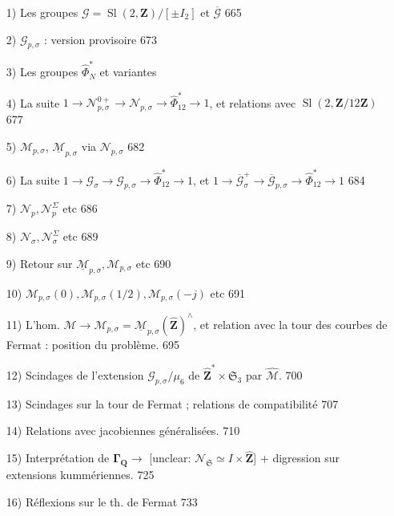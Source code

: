 \begin{enumerate}
\item[1)] Les groupes $\mathcal{G} = \operatorname{Sl}(2, \mathbf{Z}) / [\pm I_2]$ et $\overline{\mathcal{G}}$ \hfill 665
\item[2)] $\mathcal{G}_{p,\sigma}$ : version provisoire \hfill 673
\item[3)] Les groupes $\widehat{\Phi}_N^*$ et variantes
\item[4)] La suite $1 \to \mathcal{N}_{p,\sigma}^{0+} \to \mathcal{N}_{p,\sigma} \to \widehat{\Phi}_{12}^* \to 1$, et relations avec $\operatorname{Sl}(2, \mathbf{Z}/12\mathbf{Z})$ \hfill 677
\item[5)] $\mathcal{M}_{p,\sigma}$, $\underline{\mathcal{M}}_{p,\sigma}$ via $\mathcal{N}_{p,\sigma}$ \hfill 682
\item[6)] La suite $1 \to \mathcal{G}_\sigma \to \mathcal{G}_{p,\sigma} \to \widehat{\Phi}_{12}^* \to 1$, et $1 \to \overline{\mathcal{G}}_\sigma^+ \to \overline{\mathcal{G}}_{p,\sigma} \to \widehat{\Phi}_{12}^* \to 1$ \hfill 684
\item[7)] $\mathcal{N}_p, \mathcal{N}_p^\Sigma$ etc \hfill 686
\item[8)] $\mathcal{N}_\sigma, \mathcal{N}_\sigma^\Sigma$ etc \hfill 689
\item[9)] Retour sur $\underline{\mathcal{M}}_{p,\sigma}, \mathcal{M}_{p,\sigma}$ etc \hfill 690
\item[10)] $\mathcal{M}_{p,\sigma}(0), \mathcal{M}_{p,\sigma}(1/2), \mathcal{M}_{p,\sigma}(-j)$ etc \hfill 691
\item[11)] L'hom. $\mathcal{M} \to \mathcal{M}_{p,\sigma} = \underline{\mathcal{M}}_{p,\sigma}(\hat{\mathbf{Z}})^{\wedge}$, et relation avec la tour des courbes de Fermat : position du problème. \hfill 695
\item[12)] Scindages de l'extension $\mathcal{G}_{p,\sigma} / \mu_6$ de $\hat{\mathbf{Z}}^* \times \mathfrak{S}_3$ par $\hat{\mathcal{M}}$. \hfill 700
\item[13)] Scindages sur la tour de Fermat ; relations de compatibilité \hfill 707
\item[14)] Relations avec jacobiennes généralisées. \hfill 710
\item[15)] Interprétation de $\boldsymbol{\Gamma}_{\mathbf{Q}} \to$ [unclear: $\mathcal{N}_{\mathfrak{S}} \simeq I \times \hat{\mathbf{Z}}$] + digression sur extensions kummériennes. \hfill 725
\item[16)] Réflexions sur le th. de Fermat \hfill 733
\end{enumerate}

